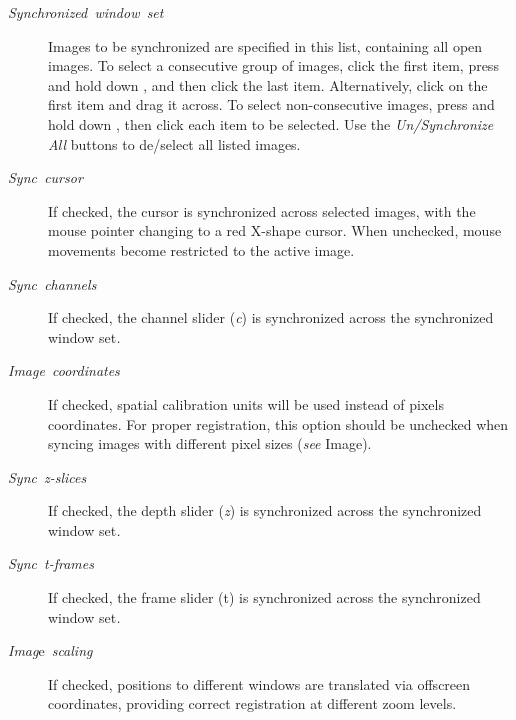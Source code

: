 \begin{description}
\item [{\emph{Synchronized\ window\ set}}] Images to be synchronized
are specified in this list, containing all open images. To select
a consecutive group of images, click the first item, press and hold
down , and then click the last item. Alternatively,
click on the first item and drag it across. To select non-consecutive
images, press and hold down , then click each item
to be selected. Use the \emph{Un/Synchronize All} buttons to de/select
all listed images.
\item [{\emph{Sync\ cursor}}] If checked, the cursor is synchronized across
selected images, with the mouse pointer changing to a red X-shape
cursor. When unchecked, mouse movements become restricted to the active
image.
\item [{\emph{Sync\ channels}}] If checked, the channel slider (\emph{c})
is synchronized across the synchronized window set\emph{.}
\item [{\emph{Image\ coordinates}}] If checked, spatial calibration units
will be used instead of pixels coordinates. For proper registration,
this option should be unchecked when syncing images with different
pixel sizes (\emph{see} Image\lyxarrow{}).
\item [{\emph{Sync}\ \emph{z-slices}}] If checked, the depth slider (\emph{z})
is synchronized across the synchronized window set\emph{.}
\item [{\emph{Sync}\ \emph{t-frames}}] If checked, the frame slider (t)
is synchronized across the synchronized window set\emph{.}
\item [{\emph{Imag}e\ \emph{scaling}}] If checked, positions to different
windows are translated via offscreen coordinates, providing correct
registration at different zoom levels.
\end{description}


\newpage{}


\section{\protect{}\label{sec:Plugins}}


\subsection{\protect{}\label{sub:Macros}}


